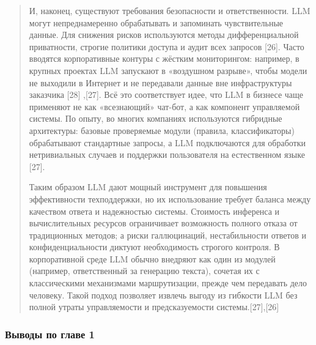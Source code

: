 \begin{quote}
И, наконец, существуют требования безопасности и ответственности. LLM
могут непреднамеренно обрабатывать и запоминать чувствительные данные.
Для снижения рисков используются методы дифференциальной приватности,
строгие политики доступа и аудит всех запросов {[}26{]}. Часто вводятся
корпоративные контуры с жёстким мониторингом: например, в крупных
проектах LLM запускают в «воздушном разрыве», чтобы модели не выходили в
Интернет и не передавали данные вне инфраструктуры заказчика {[}28{]}
,{[}27{]}. Всё это соответствует идее, что LLM в бизнесе чаще применяют
не как «всезнающий» чат-бот, а как компонент управляемой системы. По
опыту, во многих компаниях используются гибридные архитектуры: базовые
проверяемые модули (правила, классификаторы) обрабатывают стандартные
запросы, а LLM подключаются для обработки нетривиальных случаев и
поддержки пользователя на естественном языке {[}27{]}.

Таким образом LLM дают мощный инструмент для повышения эффективности
техподдержки, но их использование требует баланса между качеством ответа
и надежностью системы. Стоимость инференса и вычислительных ресурсов
ограничивает возможность полного отказа от традиционных методов; а риски
галлюцинаций, нестабильности ответов и конфиденциальности диктуют
необходимость строгого контроля. В корпоративной среде LLM обычно
внедряют как один из модулей (например, ответственный за генерацию
текста), сочетая их с классическими механизмами маршрутизации, прежде
чем передавать дело человеку. Такой подход позволяет извлечь выгоду из
гибкости LLM без полной утраты управляемости и предсказуемости
системы.{[}27{]},{[}26{]}
\end{quote}

\hypertarget{ux432ux44bux432ux43eux434ux44b-ux43fux43e-ux433ux43bux430ux432ux435-1}{%
\subsubsection{Выводы по главе
1}\label{ux432ux44bux432ux43eux434ux44b-ux43fux43e-ux433ux43bux430ux432ux435-1}}


